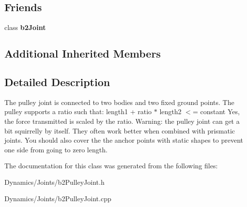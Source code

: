 \subsection*{Friends}
\begin{DoxyCompactItemize}
\item 
\mbox{\label{classb2PulleyJoint_a54ade8ed3d794298108d7f4c4e4793fa}} 
class {\bfseries b2\+Joint}
\end{DoxyCompactItemize}
\subsection*{Additional Inherited Members}


\subsection{Detailed Description}
The pulley joint is connected to two bodies and two fixed ground points. The pulley supports a ratio such that\+: length1 + ratio $\ast$ length2 $<$= constant Yes, the force transmitted is scaled by the ratio. Warning\+: the pulley joint can get a bit squirrelly by itself. They often work better when combined with prismatic joints. You should also cover the the anchor points with static shapes to prevent one side from going to zero length. 

The documentation for this class was generated from the following files\+:\begin{DoxyCompactItemize}
\item 
Dynamics/\+Joints/b2\+Pulley\+Joint.\+h\item 
Dynamics/\+Joints/b2\+Pulley\+Joint.\+cpp\end{DoxyCompactItemize}
